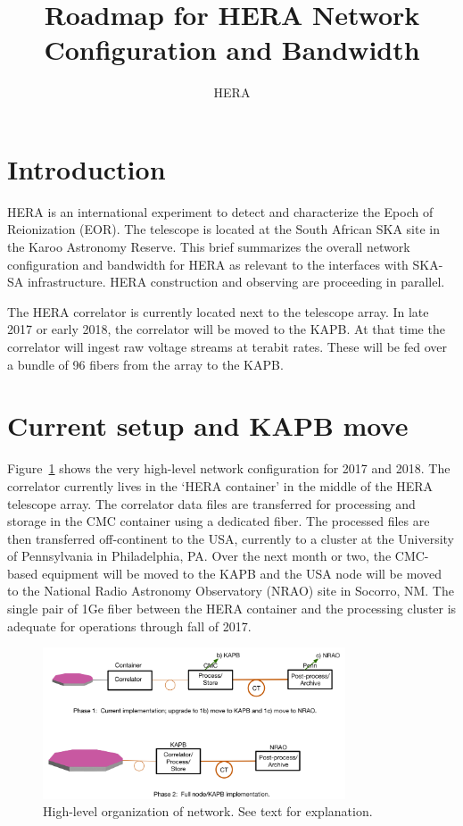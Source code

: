 \documentclass{article}
\begin{document}
\author{HERA}
\title{Roadmap for HERA Network Configuration and Bandwidth}
\maketitle

\section{Introduction}
HERA is an international experiment to detect and characterize the Epoch of
Reionization (EOR).  The telescope is located at the South African SKA site in
the Karoo Astronomy Reserve.  This brief summarizes the overall network
configuration and bandwidth for HERA as relevant to the interfaces with SKA-SA
infrastructure.  HERA construction and observing are proceeding in parallel.

The HERA correlator is currently located next to the telescope array. In late 2017 or early 2018, the correlator will be moved to the KAPB. At that time the correlator will ingest raw voltage streams at terabit rates. These will be fed over a bundle of 96 fibers from the array to the KAPB.

\section{Current setup and KAPB move}
Figure~\ref{fig:hi_level} shows the very high-level network configuration for
2017 and 2018.  The correlator currently lives in the `HERA container' in the
middle of the HERA telescope array.  The correlator data files are transferred for processing and storage in the CMC container using a dedicated fiber.  The processed files are then transferred off-continent to the USA, currently to a cluster at the University of Pennsylvania in Philadelphia, PA.  Over the next month or two, the CMC-based equipment will be moved to the KAPB and the USA node will be moved to the National Radio Astronomy Observatory (NRAO) site in Socorro, NM.  The single pair of 1Ge fiber between the HERA container and the processing cluster is adequate for operations through fall of 2017.

\begin{figure}[H]
\includegraphics[width=0.8\textwidth]{network.png}
\centering
\caption{High-level organization of network.  See text for explanation.}
\label{fig:hi_level}
\end{figure}
\end{document}
